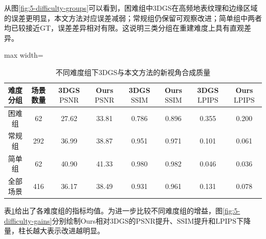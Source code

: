 从图\ref{fig:5-difficulty-groups}可以看到，困难组中3DGS在高频地表纹理和边缘区域的误差更明显，本文方法对应误差减弱；常规组仍保留可观察改进；简单组中两者均已较接近GT，误差差异相对有限。这说明三类分组在重建难度上具有直观差异。

\begin{table}[H]
    \fontsize{10.5pt}{13.125pt}\selectfont
    \caption{不同难度组下3DGS与本文方法的新视角合成质量}
    \centering\label{tab:5-3}
    \begin{adjustbox}{max width=\textwidth}
    \begin{tabular}{cccccccc}
        \toprule
        难度分组 & 场景数量 & 3DGS $\mathrm{PSNR}$ & Ours $\mathrm{PSNR}$ & 3DGS $\mathrm{SSIM}$ & Ours $\mathrm{SSIM}$ & 3DGS $\mathrm{LPIPS}$ & Ours $\mathrm{LPIPS}$ \\
        \midrule
        困难组 & 62 & 27.62 & 33.81 & 0.786 & 0.896 & 0.355 & 0.200 \\
        常规组 & 292 & 36.99 & 38.87 & 0.951 & 0.971 & 0.101 & 0.061 \\
        简单组 & 62 & 40.90 & 41.33 & 0.980 & 0.982 & 0.046 & 0.036 \\
        全部场景 & 416 & 36.17 & 38.49 & 0.931 & 0.961 & 0.131 & 0.078 \\
        \bottomrule
    \end{tabular}
    \end{adjustbox}
\end{table}

表\ref{tab:5-3}给出了各难度组的指标均值。为进一步比较不同难度组的增益，图\ref{fig:5-difficulty-gains}分别绘制Ours相对3DGS的$\mathrm{PSNR}$提升、$\mathrm{SSIM}$提升和$\mathrm{LPIPS}$下降量，柱长越大表示改进越明显。


